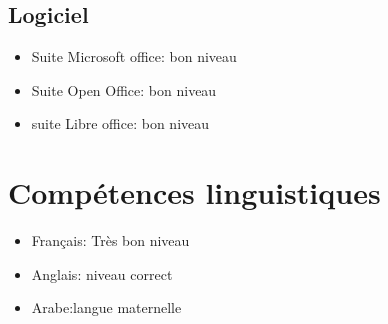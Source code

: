 \documentclass[a4paper]{article}
\begin{document}
\subsection*{Logiciel}
\begin{itemize}
\item{Suite Microsoft office: bon niveau}
\item{Suite Open Office: bon niveau}
\item{suite Libre office: bon niveau}
\end{itemize}

\section*{Compétences linguistiques}
\begin{itemize}
\item{Français: Très bon niveau}
\item{Anglais: niveau correct}
\item{Arabe:langue maternelle }
\end{itemize}
\end{document}
